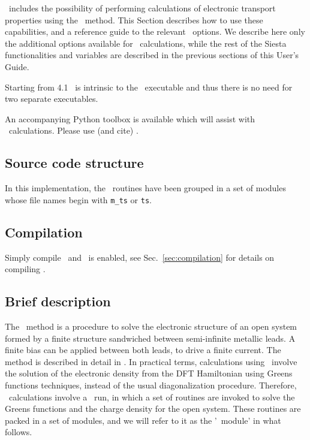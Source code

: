 \siesta\ includes the possibility of performing calculations of
electronic transport properties using the \tsiesta\ method. This
Section describes how to use these
capabilities, and a reference guide to the relevant \fdflib\
options. We describe here only the additional options available for
\tsiesta\ calculations, while the rest of the Siesta functionalities
and variables are described in the previous sections of this User's
Guide.

Starting from 4.1 \tsiesta\ is intrinsic to the \siesta\ executable
and thus there is no need for two separate executables.

An accompanying Python toolbox is available which will assist with
\tsiesta\ calculations. Please use (and cite) \sisl\cite{sisl}.


\subsection{Source code structure}

In this implementation, the \tsiesta\ routines have been grouped in a
set of modules whose file names begin with \texttt{m\_ts} or
\texttt{ts}.

\subsection{Compilation}

Simply compile \siesta\ and \tsiesta\ is enabled, see
Sec.~\ref{sec:compilation} for details on compiling \siesta.

\subsection{Brief description}

The \tsiesta\ method is a procedure to solve the electronic
structure of an open system formed by a finite structure sandwiched
between semi-infinite metallic leads. A finite bias can be applied
between both leads, to drive a finite current. The method is described
in detail in \cite{Brandbyge2002,Papior2017}. In practical terms,
calculations using \tsiesta\ involve the solution of the
electronic density from the DFT Hamiltonian using Greens functions
techniques, instead of the usual diagonalization procedure. Therefore,
\tsiesta\ calculations involve a \siesta\ run, in which a
set of routines are invoked to solve the Greens functions and the
charge density for the open system. These routines are packed in a set
of modules, and we will refer to it as the '\tsiesta\ module'
in what follows.

